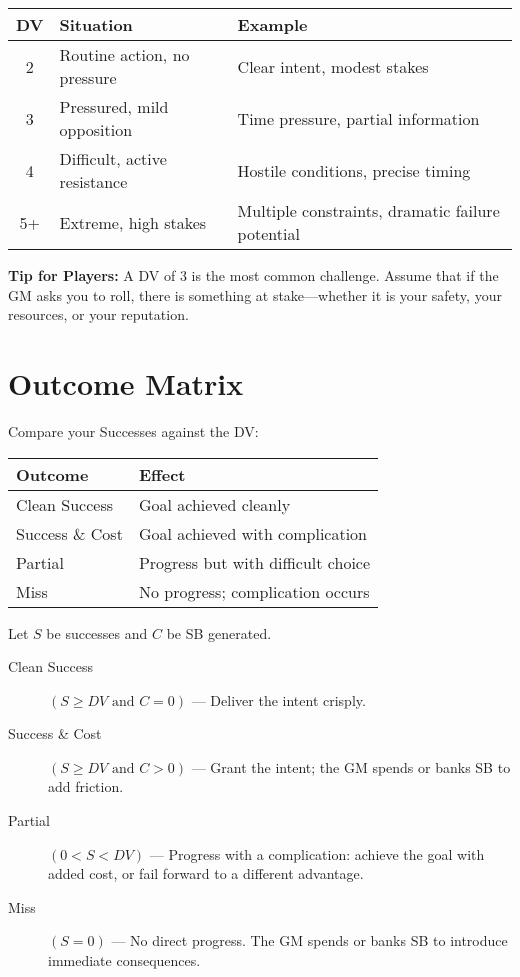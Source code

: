 \documentclass[11pt,twoside,openany]{book}
\begin{document}
\begin{center}
\begin{tabular}{|c|l|l|}
\hline
\textbf{DV} & \textbf{Situation} & \textbf{Example} \\
\hline
2 & Routine action, no pressure & Clear intent, modest stakes \\
3 & Pressured, mild opposition & Time pressure, partial information \\
4 & Difficult, active resistance & Hostile conditions, precise timing \\
5+ & Extreme, high stakes & Multiple constraints, dramatic failure potential \\
\hline
\end{tabular}
\end{center}

\textbf{Tip for Players:} A DV of 3 is the most common challenge. Assume that if the GM asks you to roll, there is something at stake—whether it is your safety, your resources, or your reputation.

\section*{Outcome Matrix} 

Compare your Successes against the DV:

\begin{center}
\begin{tabular}{|l|l|}
\hline
\textbf{Outcome} & \textbf{Effect} \\
\hline
Clean Success & Goal achieved cleanly \\
Success \& Cost & Goal achieved with complication \\
Partial & Progress but with difficult choice \\
Miss & No progress; complication occurs \\
\hline
\end{tabular}
\end{center}

Let $S$ be successes and $C$ be SB generated.

\begin{description}
\item[Clean Success] $(S \geq DV \text{ and } C = 0)$ — Deliver the intent crisply.
\item[Success \& Cost] $(S \geq DV \text{ and } C > 0)$ — Grant the intent; the GM spends or banks SB to add friction.
\item[Partial] $(0 < S < DV)$ — Progress with a complication: achieve the goal with added cost, or fail forward to a different advantage.
\item[Miss] $(S = 0)$ — No direct progress. The GM spends or banks SB to introduce immediate consequences.
\end{description}
\end{document}
